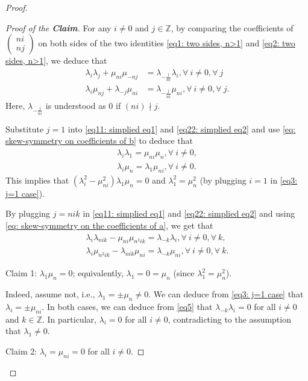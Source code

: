 \documentclass[12pt]{amsart}
\theoremstyle{definition}
\theoremstyle{remark}
\begin{document}
\begin{proof}
\begin{proof}[Proof of the \textbf{Claim}]
For any $i\neq 0$ and $j\in\mathbb{Z}$, by comparing the coefficients of $\begin{pmatrix}
ni\\
nj
\end{pmatrix}$ on both sides of the two identities \eqref{eq1: two sides, n>1} and \eqref{eq2: two sides, n>1}, we deduce that 
\begin{align}
\label{eq11: simplied eq1} \lambda_i\lambda_j+\mu_{ni}\mu_{-nj}&=\lambda_{-\frac{j}{ni}}\lambda_i, \forall~ i\neq 0, \forall ~j\\
\label{eq22: simplied eq2} \lambda_i\mu_{nj}+\lambda_{-j}\mu_{ni}&=\lambda_{-\frac{j}{ni}}\mu_{ni}, \forall~i\neq 0,\forall~j.
\end{align}
Here, $\lambda_{-\frac{j}{ni}}$ is understood as 0 if $(ni)\nmid j$.

Substitute $j=1$ into \eqref{eq11: simplied eq1} and 
\eqref{eq22: simplied eq2} and use \eqref{eq: skew-symmetry on coefficients of b} to deduce that 
\begin{align}
\label{eq3: j=1 case} \lambda_i\lambda_1=\mu_{ni}\mu_n, \forall~ i\neq 0,\\
\label{eq4: j=1 case} \lambda_i\mu_n=\lambda_1\mu_{ni},\forall~i\neq 0.
\end{align}
This implies that $(\lambda_i^2-\mu_{ni}^2)\lambda_1\mu_n=0$ and $\lambda_1^2=\mu_n^2$ (by plugging $i=1$ in \eqref{eq3: j=1 case}). 

By plugging $j=nik$ in \eqref{eq11: simplied eq1} and \eqref{eq22: simplied eq2} and using \eqref{eq: skew-symmetry on the coefficients of a}, we get that
\begin{align}
\label{eq5} \lambda_i\lambda_{nik}-\mu_{ni}\mu_{n^2ik}=\lambda_{-k}\lambda_i, \forall ~i\neq 0, \forall~ k, \\
\label{eq6} \lambda_i\mu_{n^2ik}-\lambda_{nik}\mu_{ni}=\lambda_{-k}\mu_{ni},\forall~i\neq 0, \forall~k.
\end{align}

Claim 1: $\lambda_1\mu_n=0$; equivalently, $\lambda_1=0=\mu_n$ (since $\lambda_1^2=\mu_n^2$). 

Indeed, assume not, i.e., $\lambda_1=\pm \mu_n\neq 0$. We can deduce from \eqref{eq3: j=1 case} that $\lambda_i=\pm \mu_{ni}$. In both cases, we can deduce from \eqref{eq5} that $\lambda_{-k}\lambda_i=0$ for all $i\neq 0$ and $k\in\mathbb{Z}$. In particular, $\lambda_i=0$ for all $i\neq 0$, contradicting to the assumption that $\lambda_1\neq 0$.


Claim 2: $\lambda_i=\mu_{ni}=0$ for all $i\neq 0$.


\end{proof}
\end{proof}
\end{document}
